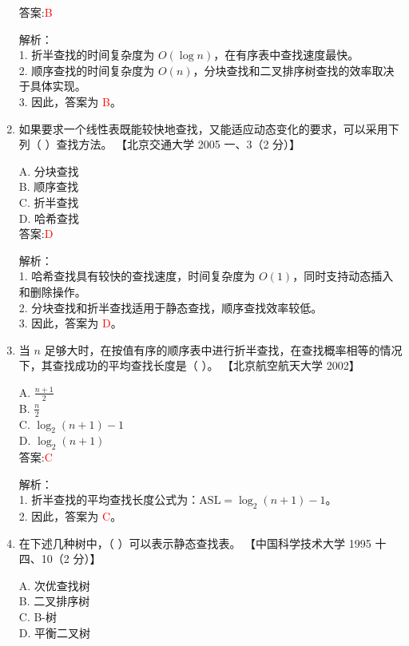 \documentclass[lang=cn,newtx,10pt,scheme=chinese]{../../../elegantbook}
\begin{document}
\begin{enumerate}
    答案:\textcolor{red}{B}

    解析：\\
    1. 折半查找的时间复杂度为 $O(\log n)$，在有序表中查找速度最快。\\
    2. 顺序查找的时间复杂度为 $O(n)$，分块查找和二叉排序树查找的效率取决于具体实现。\\
    3. 因此，答案为 \textcolor{red}{B}。\\

\item 如果要求一个线性表既能较快地查找，又能适应动态变化的要求，可以采用下列（ ）查找方法。  
    【北京交通大学 2005 一、3（2 分）】  

    A. 分块查找 \\  
    B. 顺序查找 \\  
    C. 折半查找 \\  
    D. 哈希查找 \\  

    答案:\textcolor{red}{D}

    解析：\\
    1. 哈希查找具有较快的查找速度，时间复杂度为 $O(1)$，同时支持动态插入和删除操作。\\
    2. 分块查找和折半查找适用于静态查找，顺序查找效率较低。\\
    3. 因此，答案为 \textcolor{red}{D}。\\

\item 当 $n$ 足够大时，在按值有序的顺序表中进行折半查找，在查找概率相等的情况下，其查找成功的平均查找长度是（ ）。  
    【北京航空航天大学 2002】  

    A. $\frac{n+1}{2}$ \\  
    B. $\frac{n}{2}$ \\  
    C. $\log_2(n+1) - 1$ \\  
    D. $\log_2(n+1)$ \\  

    答案:\textcolor{red}{C}

    解析：\\
    1. 折半查找的平均查找长度公式为：$\text{ASL} = \log_2(n+1) - 1$。\\
    2. 因此，答案为 \textcolor{red}{C}。\\

\item 在下述几种树中，（ ）可以表示静态查找表。  
    【中国科学技术大学 1995 十四、10（2 分）】  

    A. 次优查找树 \\  
    B. 二叉排序树 \\  
    C. B-树 \\  
    D. 平衡二叉树 \\  


\end{enumerate}
\end{document}
